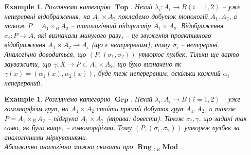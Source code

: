\documentclass[a4paper, 10pt]{article}
\theoremstyle{theoremdd}
\newtheorem{example}[theorem]{Example}
\DeclareMathOperator{\Grp}{\textbf{Grp}}
\DeclareMathOperator{\Rng}{\textbf{Rng}}
\DeclareMathOperator{\Top}{\textbf{Top}}
\DeclareMathOperator{\Mod}{\textbf{Mod}}
\begin{document}
\begin{example}
Розглянемо категорію $\Top$. Нехай $\lambda_i \colon A_i \to B (i = 1,2)$ -- уже неперервні відображення, на $A_1 \times A_2$ покладемо добуток топологій $A_1,A_2$, а також $P = A_1 \times_B A_2$ -- топологічний підпростір $A_1 \times A_2$. Відображення $\sigma_i \colon P \to A$, які визначали минулого разу, -- це звуження проєктивного відображення $A_1 \times A_2 \to A_i$ (що є неперервним), тому $\sigma_i$ -- неперервні. Аналогічно доводиться, що $(P,(\sigma_1,\sigma_2))$ утворює пулбек. Тільки ще варто зауважити, що $\gamma \colon X \to P \subset A_1 \times A_2$, що було визначено як $\gamma(x) = (\alpha_1(x),\alpha_2(x))$, буде теж неперервним, оскільки кожний $\alpha_i$ -- неперервний.
\end{example}

\begin{example}
Розглянемо категорію $\Grp$. Нехай $\lambda_i \colon A_i \to B (i = 1,2)$ -- уже гомоморфізм груп, на $A_1 \times A_2$ стоїть прямий добуток груп $A_1,A_2$, а також $P = A_1 \times_B A_2$ -- підгрупа $A_1 \times A_2$ (вправа: довести). Також $\sigma_i, \gamma$, що задані так само, як було вище, -- гомоморфізми. Тому $(P,(\sigma_1,\sigma_2))$ утворює пулбек за аналогічними міркуваннями.
\bigskip \\
Абсолютно аналогічно можна сказати про $\Rng, {}_R \Mod$.
\end{example}
\end{document}
